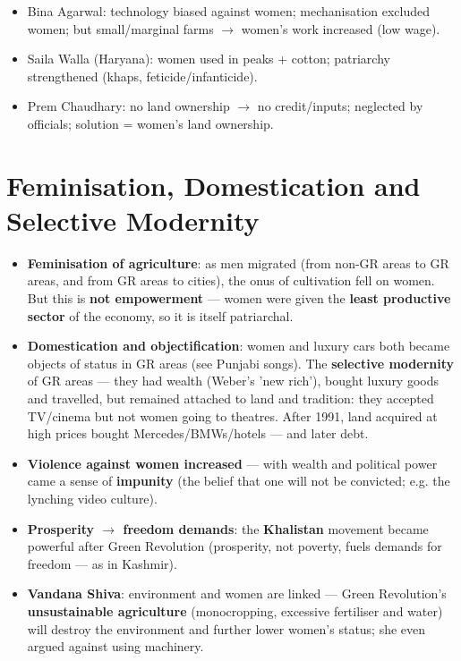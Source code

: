 \begin{QuickRevision}
\begin{itemize}
\item Bina Agarwal: technology biased against women; mechanisation excluded women; but small/marginal farms $\rightarrow$ women's work increased (low wage).
\item Saila Walla (Haryana): women used in peaks + cotton; patriarchy strengthened (khaps, feticide/infanticide).
\item Prem Chaudhary: no land ownership $\rightarrow$ no credit/inputs; neglected by officials; solution = women's land ownership.
\end{itemize}
\end{QuickRevision}

\section{Feminisation, Domestication and Selective Modernity}

\begin{KeyConcept}
\begin{itemize}
\item \textbf{Feminisation of agriculture}: as men migrated (from non-GR areas to GR areas, and from GR areas to cities), the onus of cultivation fell on women. But this is \textbf{not empowerment} --- women were given the \textbf{least productive sector} of the economy, so it is itself patriarchal.
\item \textbf{Domestication and objectification}: women and luxury cars both became objects of status in GR areas (see Punjabi songs). The \textbf{selective modernity} of GR areas --- they had wealth (Weber's 'new rich'), bought luxury goods and travelled, but remained attached to land and tradition: they accepted TV/cinema but not women going to theatres. After 1991, land acquired at high prices bought Mercedes/BMWs/hotels --- and later debt.
\item \textbf{Violence against women increased} --- with wealth and political power came a sense of \textbf{impunity} (the belief that one will not be convicted; e.g. the lynching video culture).
\item \textbf{Prosperity $\rightarrow$ freedom demands}: the \textbf{Khalistan} movement became powerful after Green Revolution (prosperity, not poverty, fuels demands for freedom --- as in Kashmir).
\item \textbf{Vandana Shiva}: environment and women are linked --- Green Revolution's \textbf{unsustainable agriculture} (monocropping, excessive fertiliser and water) will destroy the environment and further lower women's status; she even argued against using machinery.
\end{itemize}
\end{KeyConcept}

